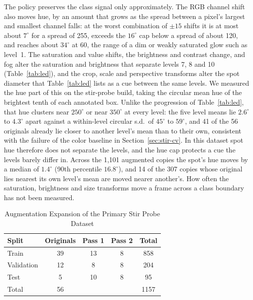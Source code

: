 ﻿\documentclass[journal]{IEEEtran}
\begin{document}
The policy preserves the class signal only approximately. The RGB channel shift also moves hue, by an amount that grows as the spread between a pixel's largest and smallest channel falls: at the worst combination of $\pm 15$ shifts it is at most about $7^{\circ}$ for a spread of 255, exceeds the $16^{\circ}$ cap below a spread of about 120, and reaches about $34^{\circ}$ at 60, the range of a dim or weakly saturated glow such as level~1. The saturation and value shifts, the brightness and contrast change, and fog alter the saturation and brightness that separate levels 7, 8 and 10 (Table~\ref{tab:led}), and the crop, scale and perspective transforms alter the spot diameter that Table~\ref{tab:led} lists as a cue between the same levels. We measured the hue part of this on the stir-probe build, taking the circular mean hue of the brightest tenth of each annotated box. Unlike the progression of Table~\ref{tab:led}, that hue clusters near $250^{\circ}$ or near $350^{\circ}$ at every level: the five level means lie $2.6^{\circ}$ to $4.3^{\circ}$ apart against a within-level circular s.d.\ of $45^{\circ}$ to $59^{\circ}$, and 41 of the 56 originals already lie closer to another level's mean than to their own, consistent with the failure of the color baseline in Section~\ref{sec:stir-cv}. In this dataset spot hue therefore does not separate the levels, and the hue cap protects a cue the levels barely differ in. Across the 1{,}101 augmented copies the spot's hue moves by a median of $1.4^{\circ}$ (90th percentile $16.8^{\circ}$), and 14 of the 307 copies whose original lies nearest its own level's mean are moved nearer another's. How often the saturation, brightness and size transforms move a frame across a class boundary has not been measured.

\begin{table}[!t]
\renewcommand{\arraystretch}{1.3}
\caption{Augmentation Expansion of the Primary Stir Probe Dataset}
\label{tab:aug}
\centering
\begin{tabular}{l c c c c}
\toprule
\textbf{Split} & \textbf{Originals} & \textbf{Pass 1} & \textbf{Pass 2} & \textbf{Total} \\
\midrule
Train      & 39 & 13 & 8 & 858 \\
Validation & 12 & 8  & 8 & 204 \\
Test       & 5  & 10 & 8 & 95 \\
\midrule
Total      & 56 &    &   & 1157 \\
\bottomrule
\end{tabular}
\end{table}
\end{document}
